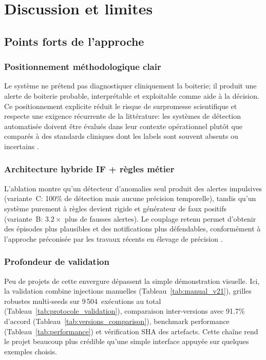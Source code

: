 \chapter{Discussion et limites}
\label{chapitre:discussion}

\section{Points forts de l'approche}

\subsection{Positionnement méthodologique clair}
Le système ne prétend pas diagnostiquer cliniquement la boiterie; il produit une alerte de
boiterie probable, interprétable et exploitable comme aide à la décision. Ce positionnement
explicite réduit le risque de surpromesse scientifique et respecte une exigence récurrente
de la littérature: les systèmes de détection automatisée doivent être évalués dans leur
contexte opérationnel plutôt que comparés à des standards cliniques dont les labels sont
souvent absents ou incertains \citep{alsaaod2019automatic}.

\subsection{Architecture hybride IF + règles métier}
L'ablation montre qu'un détecteur d'anomalies seul produit des alertes impulsives
(variante~C: 100\% de détection mais aucune précision temporelle), tandis qu'un système
purement à règles devient rigide et générateur de faux positifs (variante~B: $3.2\times$
plus de fausses alertes). Le couplage retenu permet d'obtenir des épisodes plus plausibles
et des notifications plus défendables, conformément à l'approche préconisée par les travaux
récents en élevage de précision \citep{michelena2025plf_review}.

\subsection{Profondeur de validation}
Peu de projets de cette envergure dépassent la simple démonstration visuelle. Ici, la
validation combine injections manuelles
(Tableau~\ref{tab:manual_v21}), grilles robustes multi-seeds sur 9\,504~exécutions au total
(Tableau~\ref{tab:protocole_validation}), comparaison inter-versions avec 91.7\% d'accord
(Tableau~\ref{tab:versions_comparison}), benchmark performance
(Tableau~\ref{tab:performance}) et vérification SHA des artefacts. Cette chaîne rend le
projet beaucoup plus crédible qu'une simple interface appuyée sur quelques exemples choisis.

